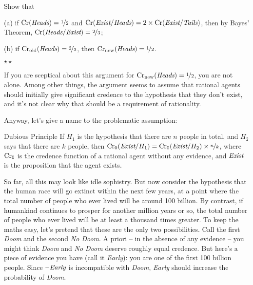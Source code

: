 \begin{exercise}
  Show that
  \begin{enumerate*}
  \item[(a)] if $\text{Cr}(\emph{Heads}) = \nicefrac{1}{2}$ and
    $\text{Cr}(\emph{Exist}/\emph{Heads}) = 2 \times
    \text{Cr}(\emph{Exist}/\emph{Tails})$, then by Bayes' Theorem,
    $\text{Cr}(\emph{Heads}/\emph{Exist}) = \nicefrac{2}{3}$;
  \item[(b)] if $\text{Cr}_\text{old}(\emph{Heads}) = \nicefrac{2}{3}$, then
    $\text{Cr}_\text{new}(\emph{Heads}) = \nicefrac{1}{2}$.
  \end{enumerate*}
  $\star\star$
\end{exercise}

If you are sceptical about this argument for $\text{Cr$_{\text{new}}$}(\emph{Heads}) =
\nicefrac{1}{2}$, you are not alone. Among other things, the argument seems to
assume that rational agents should initially give significant credence
to the hypothesis that they don't exist, and it's not clear why that
should be a requirement of rationality.

Anyway, let's give a name to the problematic assumption:
\begin{genericthm}{Dubious Principle}
  If $H_1$ is the hypothesis that there are $n$ people in total, and
  $H_2$ says that there are $k$ people, then $\text{Cr}_0(\emph{Exist} /
  H_1) = \text{Cr}_0(\emph{Exist}/H_2) \times \nicefrac{n}{k}$, where $\text{Cr}_0$
  is the credence function of a rational agent without any evidence,
  and $\emph{Exist}$ is the proposition that the agent exists.
\end{genericthm}

So far, all this may look like idle sophistry. But now consider the
hypothesis that the human race will go extinct within the next few
years, at a point where the total number of people who ever lived will
be around 100 billion. By contrast, if humankind continues to prosper
for another million years or so, the total number of people who ever
lived will be at least a thousand times greater. To keep the maths
easy, let's pretend that these are the only two possibilities. Call
the first \emph{Doom} and the second \emph{No Doom}. A priori -- in
the absence of any evidence -- you might think \emph{Doom} and
\emph{No Doom} deserve roughly equal credence. But here's a piece of
evidence you have (call it \emph{Early}): you are one of the first 100 billion
people. Since $\neg \emph{Early}$ is incompatible with \emph{Doom}, \emph{Early} should increase the probability of
\emph{Doom}. 

